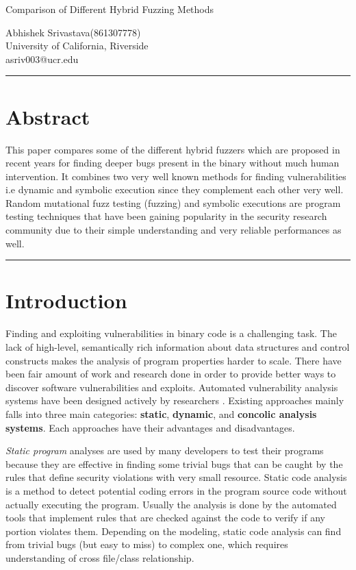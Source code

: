 \documentclass[a4paper, 11pt]{article}
\begin{document}
\begin{center}
	\huge{Comparison of Different Hybrid Fuzzing Methods}\\ 	
\end{center}

\begin{center} 	
	\large Abhishek Srivastava(861307778) \\
	University of California, Riverside\\
	asriv003@ucr.edu
	\hfill
\end{center}

\hrule
\noindent
\section*{Abstract}

This paper compares some of the different hybrid fuzzers which are proposed in recent years for finding deeper bugs present in the binary without much human intervention. It combines two very well known methods for finding vulnerabilities i.e dynamic and symbolic execution since they complement each other very well. Random mutational fuzz testing (fuzzing) and symbolic executions are program testing techniques that have been gaining popularity in the security research community due to their simple understanding and very reliable performances as well. \\ 

\hrule
\section*{Introduction}
Finding and exploiting vulnerabilities in binary code is a challenging task. The lack of high-level, semantically rich information about data structures and control constructs makes the analysis of program properties harder to scale. There have been fair amount of work and research done in order to provide better ways to discover software vulnerabilities and exploits. Automated vulnerability analysis systems have been designed actively by researchers . Existing approaches mainly falls into three main categories: \textbf{static}, \textbf{dynamic}, and \textbf{concolic analysis systems}. Each approaches have their advantages and disadvantages.

\emph{Static program} analyses are used by many developers to test their programs because they are effective in finding some trivial bugs that can be caught by the rules that define security violations with very small resource. Static code analysis is a method to detect potential coding errors in the program source code without actually executing the program. Usually the analysis is done by the automated tools that implement rules that are checked against the code to verify if any portion violates them. Depending on the modeling, static code analysis can find from trivial bugs (but easy to miss) to complex one, which requires understanding of cross file/class relationship. 
\end{document}
